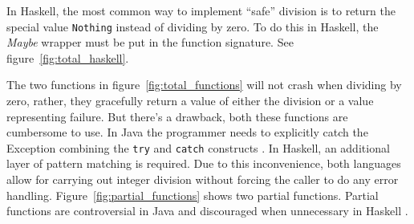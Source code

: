 \begin{figure}
\end{figure}


In Haskell, the most common way to implement ``safe'' division is to return the
special value \texttt{Nothing} instead of dividing by zero. To do this in
Haskell, the \emph{Maybe} wrapper must be put in the function signature. See
figure~\ref{fig:total_haskell}.

The two functions in figure~\ref{fig:total_functions} will not crash when dividing
by zero, rather, they gracefully return a value of either the division or a
value representing failure. But there's a drawback, both these functions are
cumbersome to use. In Java the programmer needs to explicitly catch the
Exception combining the \texttt{try} and \texttt{catch} constructs
\cite{oracle_java_doc_compile_time_checking_of_exceptions, oracle_java_doc_catch}.
In Haskell, an additional layer of pattern
matching is required. Due to this inconvenience, both languages allow
for carrying out integer division without forcing the caller to do any
error handling. Figure~\ref{fig:partial_functions} shows two partial
functions. Partial functions are controversial in Java
\cite{oracle_java_doc_controversy} and discouraged when unnecessary in
Haskell \cite{haskellwiki_avoiding_partial_functions}.


